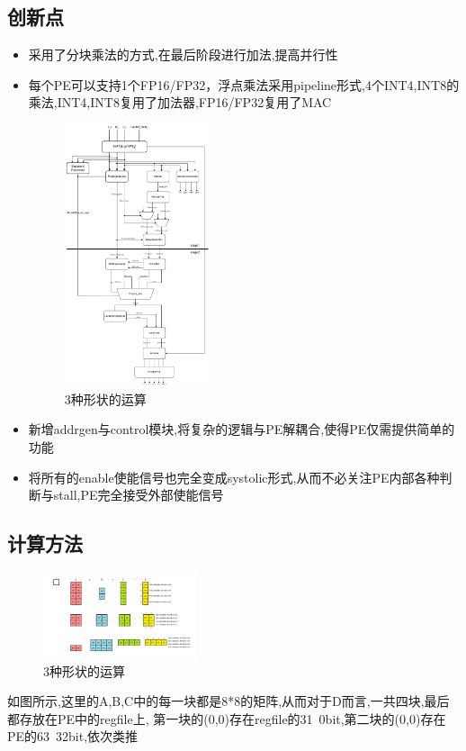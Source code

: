 \documentclass[zihao=-4, UTF8]{ctexart}
\begin{document}
\subsection{创新点}
\begin{itemize}
  \item 采用了分块乘法的方式,在最后阶段进行加法,提高并行性
  \item 每个PE可以支持1个FP16/FP32，浮点乘法采用pipeline形式,4个INT4,INT8的乘法,INT4,INT8复用了加法器,FP16/FP32复用了MAC
  \begin{figure}[H]
      \centering
      \includegraphics[width=0.4\textwidth]{FP.png}
      \caption{3种形状的运算}
      \label{fig:FP16/FP32}
    \end{figure}
  \item 新增addrgen与control模块,将复杂的逻辑与PE解耦合,使得PE仅需提供简单的功能
  \item 将所有的enable使能信号也完全变成systolic形式,从而不必关注PE内部各种判断与stall,PE完全接受外部使能信号
\end{itemize}

\subsection{计算方法}
\begin{figure}[H]
      \centering
      \includegraphics[width=0.4\textwidth]{计算.png}
      \caption{3种形状的运算}
      \label{fig:compute}
    \end{figure}
如图所示,这里的A,B,C中的每一块都是8*8的矩阵,从而对于D而言,一共四块,最后都存放在PE中的regfile上,
第一块的(0,0)存在regfile的31~0bit,第二块的(0,0)存在PE的63~32bit,依次类推
\end{document}

